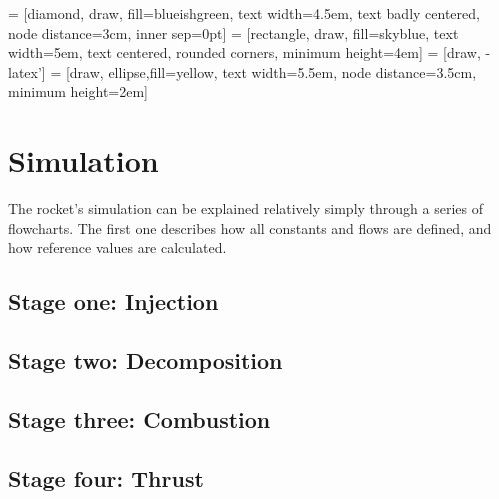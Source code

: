 = [diamond, draw, fill=blueishgreen,
    text width=4.5em, text badly centered, node distance=3cm, inner sep=0pt]
 = [rectangle, draw, fill=skyblue,
    text width=5em, text centered, rounded corners, minimum height=4em]
 = [draw, -latex']
 = [draw, ellipse,fill=yellow, text width=5.5em, node distance=3.5cm,
    minimum height=2em]



\chapter{Simulation}

The rocket's simulation can be explained relatively simply through a series of flowcharts. The first one describes how all constants and flows are defined, and how reference values are calculated.


\section{Stage one: Injection}



\section{Stage two: Decomposition}
\section{Stage three: Combustion}
\section{Stage four: Thrust}


